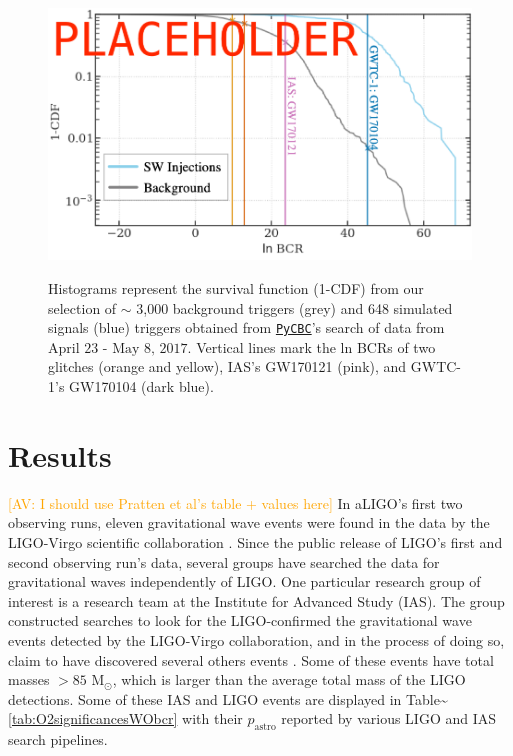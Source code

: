 \documentclass[%
preprint,
 amsmath,amssymb,
 aps,
]{revtex4}
\newcommand{\pycbc}{{\sc \href{https://pycbc.org/}{\texttt{PyCBC}}}\xspace}
\newcommand{\msun}{{\sc M${}_\odot$}\xspace}
\newcommand{\av}[1]{\textcolor{orange}{[AV: #1]}}
\begin{document}
\begin{figure}[!h]
{\centering \includegraphics[width=0.75\linewidth]{images/bcr_cdf} }
\caption[BCR distribution example]{Histograms represent the survival function (1-CDF) from our selection of $\sim$ 3,000 background triggers (grey) and 648 simulated signals (blue) triggers obtained from \pycbc's search of data from $\text{April 23 - May 8, 2017}$. Vertical lines mark the ln BCRs of two glitches (orange and yellow), IAS's GW170121 (pink), and GWTC-1's GW170104 (dark blue).}\label{fig:bcrCdf}
\end{figure}






\section{\label{sec:Results}Results}
\av{I should use Pratten et al's table + values here}
In aLIGO's first two observing runs, eleven gravitational wave events were found in the data by the LIGO-Virgo scientific collaboration \citep{abbott2019gwtc}. Since the public release of LIGO's first and second observing run's data, several groups have searched the data for gravitational waves independently of LIGO. One particular research group of interest is a research team at the Institute for Advanced Study (IAS). The group constructed searches to look for the LIGO-confirmed the gravitational wave events detected by the LIGO-Virgo collaboration, and in the process of doing so, claim to have discovered several others events \citep{IAS0, IAS1, IAS2}. Some of these events have total masses $>85$ \msun, which is larger than the average total mass of the LIGO detections. Some of these IAS and LIGO events are displayed in Table\textasciitilde\ref{tab:O2significancesWObcr} with their $p_\text{astro}$ reported by various LIGO and IAS search pipelines.\\
\end{document}
